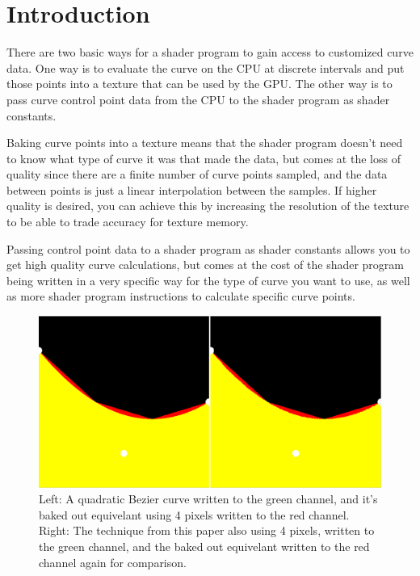 \documentclass{jcgt}
\begin{document}
\section{Introduction}
\label{sec:introduction}
There are two basic ways for a shader program to gain access to customized curve data.  One way is to evaluate the curve on the CPU at discrete intervals and put those points into a texture that can be used by the GPU.  The other way is to pass curve control point data from the CPU to the shader program as shader constants.

Baking curve points into a texture means that the shader program doesn't need to know what type of curve it was that made the data, but comes at the loss of quality since there are a finite number of curve points sampled, and the data between points is just a linear interpolation between the samples.  If higher quality is desired, you can achieve this by increasing the resolution of the texture to be able to trade accuracy for texture memory.

Passing control point data to a shader program as shader constants allows you to get high quality curve calculations, but comes at the cost of the shader program being written in a very specific way for the type of curve you want to use, as well as more shader program instructions to calculate specific curve points.

\begin{figure}
  \includegraphics[width=5in]{Figure2.png}
  \caption{Left: A quadratic Bezier curve written to the green channel, and it's baked out equivelant using 4 pixels written to the red channel.  Right: The technique from this paper also using 4 pixels, written to the green channel, and the baked out equivelant written to the red channel again for comparison. \label{fig:sampleconfig}}
  \label{fig:quickcomparison}
\end{figure}
\end{document}
